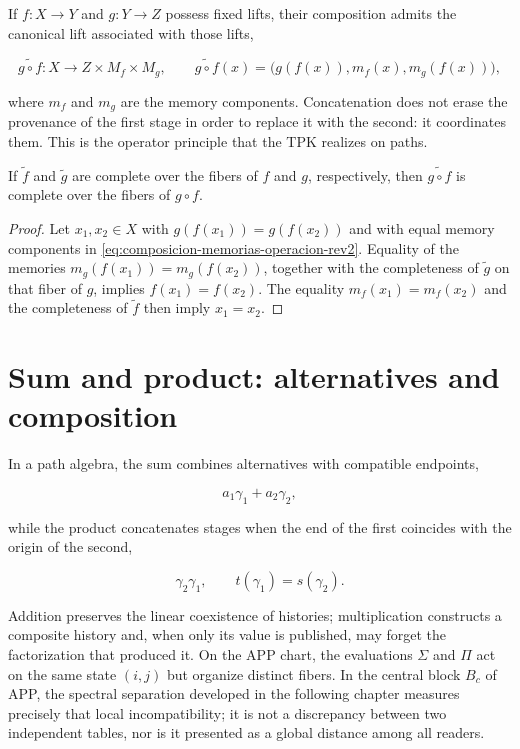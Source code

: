 If \(f:X\to Y\) and \(g:Y\to Z\) possess fixed lifts, their composition
admits the canonical lift associated with those lifts,

\begin{equation}
 \widetilde{g\circ f}:X\longrightarrow Z\times M_f\times M_g,
 \qquad
 \widetilde{g\circ f}(x)
 =\bigl(g(f(x)),m_f(x),m_g(f(x))\bigr),
 \label{eq:composicion-memorias-operacion-rev2}
\end{equation}

where \(m_f\) and \(m_g\) are the memory components. Concatenation does not
erase the provenance of the first stage in order to replace it with the second: it
coordinates them. This is the operator principle that the TPK realizes on paths.

\begin{lemma}
\label{lem:composicion-levantamientos-completos-rev2}
If \(\widetilde f\) and \(\widetilde g\) are complete over the fibers of
\(f\) and \(g\), respectively, then
\(\widetilde{g\circ f}\) is complete over the fibers of \(g\circ f\).
\end{lemma}

\begin{proof}
Let \(x_1,x_2\in X\) with
\(g(f(x_1))=g(f(x_2))\) and with equal memory components in
\eqref{eq:composicion-memorias-operacion-rev2}. Equality of the memories
\(m_g(f(x_1))=m_g(f(x_2))\), together with the completeness of
\(\widetilde g\) on that fiber of \(g\), implies
\(f(x_1)=f(x_2)\). The equality
\(m_f(x_1)=m_f(x_2)\) and the completeness of \(\widetilde f\) then imply
\(x_1=x_2\).
\end{proof}

\section{Sum and product: alternatives and composition}

In a path algebra, the sum combines alternatives with compatible endpoints,

\[
 a_1\gamma_1+a_2\gamma_2,
\]

while the product concatenates stages when the end of the first
coincides with the origin of the second,

\[
 \gamma_2\gamma_1,
 \qquad t(\gamma_1)=s(\gamma_2).
\]

Addition preserves the linear coexistence of histories; multiplication constructs a composite history and, when only its value is published, may forget the factorization that produced it. On the APP chart, the evaluations \(\Sigma\) and \(\Pi\) act on the same state \((i,j)\) but organize distinct fibers. In the central block \(B_c\) of APP, the spectral separation developed in the following chapter measures precisely that local incompatibility; it is not a discrepancy between two independent tables, nor is it presented as a global distance among all readers.

